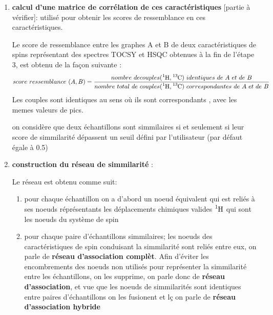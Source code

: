 \documentclass[12pt, french, latin.medieval, a4paper]{report}
\begin{document}
\begin{enumerate}
        \textbf{En gros une caractéristique du système de spin est une réprésentation sous forme de graphe d'un spectre TOCSY symétrisé et croisé avec un spectre HSQC correspondant suivant la dimension $\ce{^{1}_{}H}$; ce graphe pouvant toujours etre vu comme un tableau }.


        \item \textbf{calcul d'une matrice de corrélation de ces caractéristiques} [partie à vérifier]: utilisé pour obtenir les scores de ressemblance en ces caractéristiques.

        Le score de ressemblance entre les graphes A et B de deux caractéristiques de spins représentant des spectres TOCSY et HSQC obtenues à la fin de l'étape 3, est obtenu de la façon suivante :
        $$ score\ ressemblance\ (A,B) = \frac{nombre\ de couples (\ce{^{1}_{}H},\ce{^{13}_{}C}) \ identiques\ de\ A\ et\ de\ B}{nombre\ total\ de\ couples (\ce{^{1}_{}H},\ce{^{13}_{}C}) \ correspondantes\ de\ A\ et\ de\ B}$$
        Les couples sont identiques au sens où ils sont correspondants , avec les memes valeurs de pics.

        on considère que deux échantillons sont simmilaires si et seulement si leur score de simmilarité dépassent un seuil défini par l'utilisateur (par défaut égale à 0.5)
        
        \item \textbf{construction du réseau de simmilarité} :
        
        Le réseau est obtenu comme suit:
        \begin{enumerate}
            \item  pour chaque échantillon on a d'abord un noeud équivalent qui est reliés à ses noeuds réprésentants les déplacements chimiques valides $\ce{^{1}_{}H}$ qui sont les noeuds du système de spin
            \item  pour chaque paire d'échantillons simmilaires; les noeuds des caractéristiques de spin conduisant la simmilarité sont reliés entre eux, on parle de \textbf{réseau d'association complèt}.
        Afin d'éviter les encombrements des noeuds non utilisés pour représenter la simmilarité entre les échantillons, on les supprime, on parle donc de \textbf{réseau d'association}, et vue que les noeuds de simmilarités sont identiques entre paires d'échantillons on les fusionent et lç on parle de \textbf{réseau d'association hybride}
        \end{enumerate}
       
    \end{enumerate}
\end{document}
